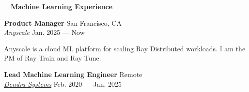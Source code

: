 \documentclass[a4paper,12pt]{article}
\newcommand{\resheading}[1]{{\hspace{-9pt} \colorbox{mygrey}{\begin{minipage}{\textwidth}{\textmd{~~\large \textbf{#1} \vphantom{p\^{E}}}}\end{minipage}}\vspace{6pt}} }
\newcommand{\ressubheading}[4]{{\begin{minipage}{\textwidth}
                                    \textbf{#1} \hfill #2 \\
                                    \textit{#3} \hfill #4 \\
\end{minipage}}}
\begin{document}
%


    \resheading{Machine Learning Experience}

    \ressubheading{Product Manager}{San Francisco, CA}{Anyscale}{Jan. 2025 --- Now}

    \vspace{-6pt} Anyscale is a cloud ML platform for scaling Ray Distributed workloads. I am the PM of Ray Train and Ray Tune.\\

    \ressubheading{Lead Machine Learning Engineer}{Remote}{\href{dendra.io}{Dendra Systems}}{Feb. 2020 --- Jan. 2025}
\end{document}
